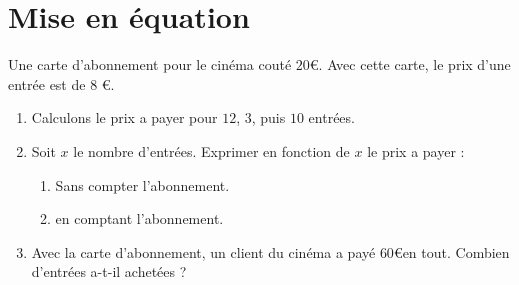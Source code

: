 \documentclass[a4paper,10pt]{report}
\begin{document}
\section{Mise en équation}

\begin{meth}[\href{https://www.youtube.com/watch?v=q3ijSWk1iF8}{Mettre en équation}]
Une carte d'abonnement pour le cinéma couté $20$\euro . Avec cette carte, le prix d'une entrée est de $8$ \euro .

\begin{enumerate}
\item Calculons le prix a payer pour $12$, $3$, puis $10$ entrées.

\medskip
\noindent\grandscarreaux{\linewidth}{2.4cm}
\item Soit $x$ le nombre d'entrées. Exprimer en fonction de $x$ le prix a payer : 
\begin{enumerate}
\item Sans compter l'abonnement.

\medskip
\noindent\grandscarreaux{\linewidth}{3.2cm}
\item en comptant l'abonnement.

\medskip
\noindent\grandscarreaux{\linewidth}{3.2cm}
\end{enumerate}
\item Avec la carte d'abonnement, un client du cinéma a payé $60$\euro en tout. Combien d'entrées a-t-il achetées ?

\medskip
\noindent\grandscarreaux{\linewidth}{3.2cm}
\end{enumerate}
\end{meth}
\end{document}
